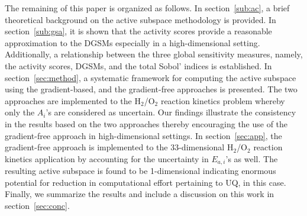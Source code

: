  The remaining of this paper is organized as follows. In section~\ref{sub:ac}, a brief theoretical background on
 the active subspace methodology is provided. In section~\ref{sub:gsa}, it is shown that the activity
 scores provide a reasonable approximation to the DGSMs especially in a high-dimensional setting. 
 Additionally, a relationship between the three global sensitivity measures, namely, the activity scores,
 DGSMs, and the total Sobol' indices is established. In section~\ref{sec:method}, a systematic framework
 for computing the active subspace using the gradient-based, and the gradient-free approaches is presented. 
The two approaches are implemented to the H$_2$/O$_2$ reaction kinetics problem whereby only
the $A_i$'s are considered as uncertain. Our findings illustrate the consistency in the results based on
the two approaches thereby encouraging the use of the gradient-free approach in high-dimensional settings.
 In section~\ref{sec:app},
the gradient-free approach is implemented to the 33-dimensional
H$_2$/O$_2$ reaction kinetics application by accounting for the uncertainty in $E_{a,i}$'s as well. The
resulting active subspace is found to be 1-dimensional indicating enormous potential for reduction in
computational effort pertaining to UQ, in this case. 
Finally, we summarize the results and include a discussion on this work in section~\ref{sec:conc}.










 




